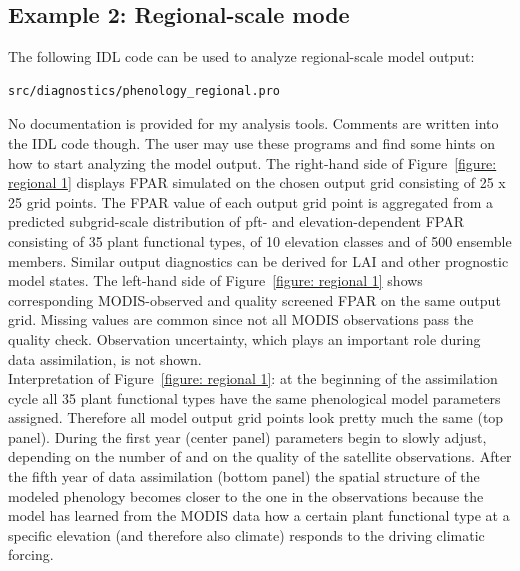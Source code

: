 \documentclass[a4paper,12pt]{article}
\begin{document}
\clearpage

\subsection{Example 2: Regional-scale mode}
The following IDL code can be used to analyze regional-scale model output:
\begin{verbatim}
src/diagnostics/phenology_regional.pro
\end{verbatim}
No documentation is provided for my analysis tools. Comments are written into the IDL code though. The user may use these programs and find some hints on how to start analyzing the model output. The right-hand side of Figure~\ref{figure: regional 1} displays FPAR simulated on the chosen output grid consisting of 25 x 25 grid points. The FPAR value of each output grid point is aggregated from a predicted subgrid-scale distribution of pft- and elevation-dependent FPAR consisting of 35 plant functional types, of 10 elevation classes and of 500 ensemble members. Similar output diagnostics can be derived for LAI and other prognostic model states. The left-hand side of Figure~\ref{figure: regional 1} shows corresponding MODIS-observed and quality screened FPAR on the same output grid. Missing values are common since not all MODIS observations pass the quality check. Observation uncertainty, which plays an important role during data assimilation, is not shown.\\

Interpretation of Figure~\ref{figure: regional 1}: at the beginning of the assimilation cycle all 35 plant functional types have the same phenological model parameters assigned. Therefore all model output grid points look pretty much the same (top panel). During the first year (center panel) parameters begin to slowly  adjust, depending on the number of and on the quality of the satellite observations. After the fifth year of data assimilation (bottom panel) the spatial structure of the modeled phenology becomes closer to the one in the observations because the model has learned from the MODIS data how a certain plant functional type at a specific elevation (and therefore also climate) responds to the driving climatic forcing. 
\end{document}
